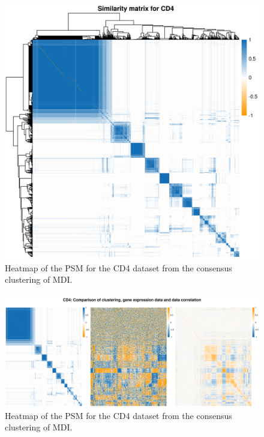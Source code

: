 \documentclass[12pt]{article} %
\begin{document}
	\newpage
	
	
	
	\begin{figure}[h]
		\centering
		\includegraphics[scale=0.75]{Images/Biology_data/Set_1000/All_datasets/Similarity_matrices/similarity_matrix_CD4.png}
		\caption{Heatmap of the PSM for the CD4 dataset from the consensus clustering of MDI.}
		\label{fig:results:cedar_2:mdi_cd4_psm}
	\end{figure}
	
	\newpage
	
	\begin{figure}
		\centering
		\includegraphics[scale=0.5]{Images/Biology_data/Set_1000/All_datasets/Comparison_expression_clustering_correlation/CD4.png}
		\caption{Heatmap of the PSM for the CD4 dataset from the consensus clustering of MDI.}
		\label{fig:results:cedar_2:mdi_cd4_psm_expr_cor}
	\end{figure}
	
\end{document}
